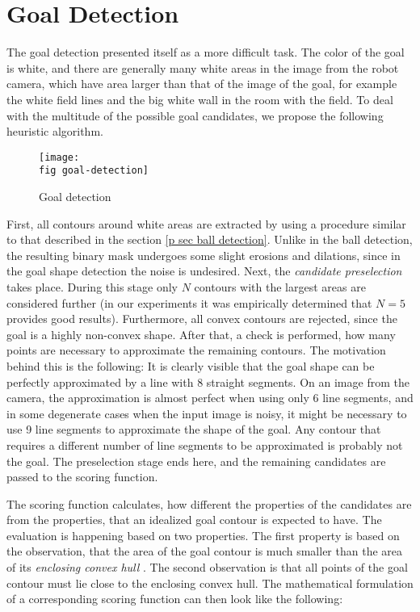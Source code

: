 \section{Goal Detection}
\label{p sec goal detect}

The goal detection presented itself as a more difficult task. The color of the
goal is white, and there are generally many white areas in the image from the
robot camera, which have area larger than that of the image of the goal, for
example the white field lines and the big white wall in the room with the
field. To deal with the multitude of the possible goal candidates, we
propose the following heuristic algorithm.

\begin{figure}[ht]
  \texttt{[image: \\fig goal-detection]}
  \caption{Goal detection}
  \label{p figure goal-detection}
\end{figure}

First, all contours around white areas are extracted by using a procedure
similar to that described in the section \ref{p sec ball detection}. Unlike in
the ball detection, the resulting binary mask undergoes some slight erosions
and dilations, since in the goal shape detection the noise is undesired. Next,
the \textit{candidate preselection} takes place. During this stage only $N$
contours with the largest areas are considered further (in our experiments it
was empirically determined that $N=5$ provides good results). Furthermore, all
convex contours are rejected, since the goal is a highly non-convex shape.
After that, a check is performed, how many points are necessary to approximate
the remaining contours. The motivation behind this is the following: It is
clearly visible that the goal shape can be perfectly approximated by a line
with 8 straight segments. On an image from the camera, the approximation is
almost perfect when using only 6 line segments, and in some degenerate cases
when the input image is noisy, it might be necessary to use 9 line segments to
approximate the shape of the goal. Any contour that requires a different number
of line segments to be approximated is probably not the goal. The preselection
stage ends here, and the remaining candidates are passed to the scoring
function.

The scoring function calculates, how different the properties of the
candidates are from the properties, that an idealized goal contour is expected
to have. The evaluation is happening based on two properties. The first
property is based on the observation, that the area of the goal contour is much
smaller than the area of its \textit{enclosing convex hull} \cite{convex-hull}.
The second observation is that all points of the goal contour must lie close to
the enclosing convex hull. The mathematical formulation of a corresponding
scoring function can then look like the following:

